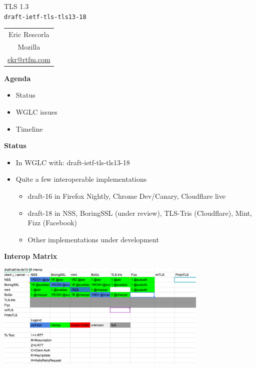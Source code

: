 \documentclass[helvetica]{seminar}
\newcommand{\heading}[1]{%
  \begin{center} 
    \large\bf 
    #1 
  \end{center} 
  \vspace{.4 in}}
\begin{document}
\begin{slide}
\begin{center}
\vspace{.5 in}
\LARGE{{\bf}TLS 1.3\\{\small \verb^draft-ietf-tls-tls13-18^}}\\
\vspace{.2in}
\large{
\begin{tabular}{c}
Eric Rescorla\\
Mozilla\\
\url{ekr@rtfm.com}
\end{tabular}
}
\end{center}
\end{slide}

\centerslidesfalse 

\begin{slide}
\heading{Agenda}

\begin{itemize}
\item Status
\item WGLC issues
\item Timeline
\end{itemize}

\end{slide}


\begin{slide}
\heading{Status}

\begin{itemize}
\item In WGLC with: draft-ietf-tls-tls13-18
\item Quite a few interoperable implementations
  \begin{itemize}
  \item draft-16 in Firefox Nightly, Chrome Dev/Canary, Cloudflare live
  \item draft-18 in NSS, BoringSSL (under review), TLS-Tris (Cloudflare), Mint, Fizz (Facebook)
  \item Other implementations under development
  \end{itemize}
\end{itemize}
\end{slide}

\begin{slide}
\heading{Interop Matrix}

\includegraphics[width=4in]{interop}
\end{slide}
\end{document}
